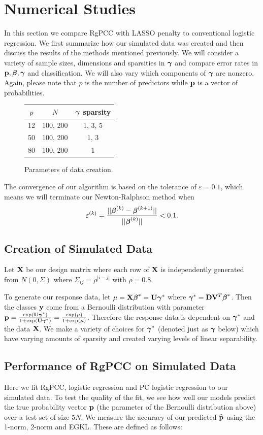 \documentclass[main.tex]{subfiles}
\begin{document}
\section{Numerical Studies}
In this section we compare RgPCC with LASSO penalty to conventional logistic regression. We first summarize how our simulated data was created and then discuss the results of the methods mentioned previously. We will consider a variety of sample sizes, dimensions and sparsities in $\boldsymbol \gamma$ and compare error rates in $\mathbf{p}, \boldsymbol \beta, \boldsymbol \gamma$ and classification. We will also vary which components of $\boldsymbol \gamma$ are nonzero. Again, please note that $p$ is the number of predictors while $\mathbf{p}$ is a vector of probabilities.

\begin{figure}[H]
	\begin{tabular}{c|c|c}
		$p$ & $N$ & $\boldsymbol \gamma$ sparsity \\ \hline
		12 & 100, 200 & 1, 3, 5 \\
		50 & 100, 200 & 1, 3 \\
		80 & 100, 200 & 1
	\end{tabular}
	\caption{Parameters of data creation.}
	\label{figure:params}
\end{figure}

The convergence of our algorithm is based on the tolerance of $\varepsilon = 0.1$, which means we will terminate our Newton-Ralphson method when $$\varepsilon^{(k)} = \frac{||\boldsymbol \beta^{(k)} - \boldsymbol \beta^{(k+1)}||}{||\boldsymbol \beta^{(k)}||} < 0.1.$$

\subsection{Creation of Simulated Data}
Let $\mathbf{X}$ be our design matrix where each row of $\mathbf{X}$ is independently generated from $N(0, \Sigma)$ where $\Sigma_{ij} = \rho^{|i - j|}$ with $\rho = 0.8$.

To generate our response data, let $\mu = \mathbf{X} \boldsymbol \beta^* = \mathbf{U} \boldsymbol \gamma^*$ where $\boldsymbol \gamma^* = \mathbf{D} \mathbf{V}^T \boldsymbol \beta^*$. Then the classes $\mathbf{y}$ come from a Bernoulli distribution with parameter $\mathbf{p} = \frac{\text{exp}(\mathbf{U} \boldsymbol \gamma^*)}{1 + \text{exp}(\mathbf{U} \boldsymbol \gamma^*)} = \frac{\text{exp}(\mu)}{1 + \text{exp}(\mu)}$. Therefore the response data is dependent on $\boldsymbol \gamma^*$ and the data $\mathbf{X}$. We make a variety of choices for $\boldsymbol \gamma^*$ (denoted just as $\boldsymbol \gamma$ below) which have varying amounts of sparsity and created varying levels of linear separability.

\subsection{Performance of RgPCC on Simulated Data}
Here we fit RgPCC, logistic regression and PC logistic regression to our simulated data. To test the quality of the fit, we see how well our models predict the true probability vector $\mathbf{p}$ (the parameter of the Bernoulli distribution above) over a test set of size $5N$. We measure the accuracy of our predicted $\widehat{\mathbf{p}}$ using the 1-norm, 2-norm and EGKL. These are defined as follows:
\end{document}
